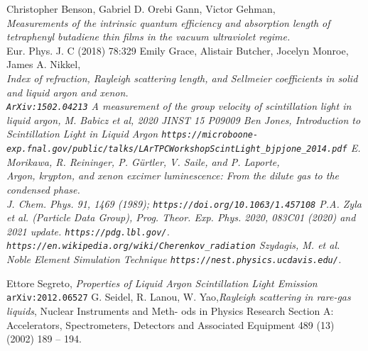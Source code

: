 \documentclass{article}
\begin{document}
\begin{thebibliography}{99}
 Christopher Benson, Gabriel D. Orebi Gann, Victor Gehman,\\
  {\it Measurements of the intrinsic quantum efficiency and absorption
      length of tetraphenyl butadiene thin films in the vacuum
      ultraviolet regime.}\\
Eur. Phys. J. C (2018) 78:329
Emily Grace, Alistair Butcher, Jocelyn Monroe, James A. Nikkel,\\
  \it{Index of refraction, Rayleigh scattering length, and Sellmeier coefficients in solid and liquid argon and xenon.}\\
  \verb|ArXiv:1502.04213|
  \it{A measurement of the group velocity of scintillation light in liquid argon},
  M. Babicz et al, 2020 JINST 15 P09009
  Ben Jones, \it{Introduction to Scintillation Light in Liquid Argon}
  \verb|https://microboone-exp.fnal.gov/public/talks/LArTPCWorkshopScintLight_bjpjone_2014.pdf|
  E. Morikawa, R. Reininger, P. Gürtler, V. Saile, and P. Laporte,\\
\it{Argon, krypton, and xenon excimer luminescence: From the dilute gas to the
condensed phase.}\\
J. Chem. Phys. 91, 1469 (1989);
  \verb|https://doi.org/10.1063/1.457108|
P.A. Zyla et al. (Particle Data Group), Prog. Theor. Exp. Phys. 2020, 083C01 (2020) and 2021 update.
\verb|https://pdg.lbl.gov/|.
  \verb|https://en.wikipedia.org/wiki/Cherenkov_radiation|
  Szydagis, M. et al. {\it Noble Element Simulation Technique}
  \verb|https://nest.physics.ucdavis.edu/|.

  Ettore Segreto, {\it Properties of Liquid Argon Scintillation Light Emission}
  \verb|arXiv:2012.06527|
  G. Seidel, R. Lanou, W. Yao,{\it  Rayleigh scattering in rare-gas liquids}, Nuclear Instruments and Meth-
ods in Physics Research Section A: Accelerators, Spectrometers, Detectors and Associated Equipment
489 (13) (2002) 189 – 194.
  
\end{thebibliography}
\end{document}
